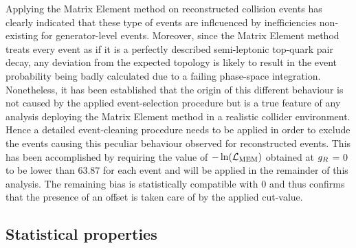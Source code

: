 Applying the Matrix Element method on reconstructed collision events has clearly indicated that these type of events are inflcuenced by inefficiencies non-existing for generator-level events.
Moreover, since the Matrix Element method treats every event as if it is a perfectly described semi-leptonic top-quark pair decay, any deviation from the expected topology is likely to result in the event probability being badly calculated due to a failing phase-space integration.
Nonetheless, it has been established that the origin of this different behaviour is not caused by the applied event-selection procedure but is a true feature of any analysis deploying the Matrix Element method in a realistic collider environment.
\\
Hence a detailed event-cleaning procedure needs to be applied in order to exclude the events causing this peculiar behaviour observed for reconstructed events.
This has been accomplished by requiring the value of $-\ln(\mathcal{L}_{\textrm{MEM}})$ obtained at $g_{R}$ = 0 to be lower than $63.87$ for each event and will be applied in the remainder of this analysis.
The remaining bias is statistically compatible with $0$ and thus confirms that the presence of an offset is taken care of by the applied cut-value.

\subsection{Statistical properties} \label{subsec::StatProp}

